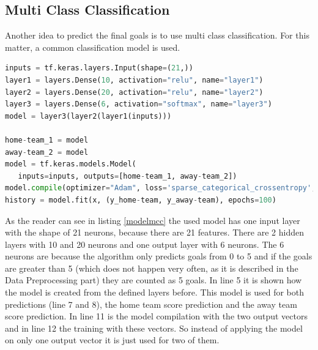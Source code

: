 \begin{table}
\centering
{}
\caption{ Quality Model for Away Team and Home Team}
\label{table:qualitymodelregression}
\end{table}

\subsection{Multi Class Classification}
Another idea to predict the final goals is to use multi class classification. For this matter, a common classification model is used.

\begin{lstlisting}[language=Python, caption=Python code for multi class classification, label=modelmcc]
inputs = tf.keras.layers.Input(shape=(21,))
layer1 = layers.Dense(10, activation="relu", name="layer1")
layer2 = layers.Dense(20, activation="relu", name="layer2")
layer3 = layers.Dense(6, activation="softmax", name="layer3")
model = layer3(layer2(layer1(inputs)))

home-team_1 = model
away-team_2 = model
model = tf.keras.models.Model(
   inputs=inputs, outputs=[home-team_1, away-team_2])
model.compile(optimizer="Adam", loss='sparse_categorical_crossentropy', metrics=[ "acc"])
history = model.fit(x, (y_home-team, y_away-team), epochs=100)
\end{lstlisting}

As the reader can see in listing \ref{modelmcc} the used model has one input layer with the shape of 21 neurons, because there are 21 features. There are 2 hidden layers with 10 and 20 neurons and one output layer with 6 neurons. The 6 neurons are because the algorithm only predicts goals from 0 to 5 and if the goals are greater than 5 (which does not happen very often, as it is described in the Data Preprocessing part) they are counted as 5 goals. In line 5 it is shown how the model is created from the defined layers before. This model is used for both predictions (line 7 and 8), the home team score prediction and the away team score prediction. In line 11 is the model compilation with the two output vectors and in line 12 the training with these vectors. So instead of applying the model on only one output vector it is just used for two of them. 

